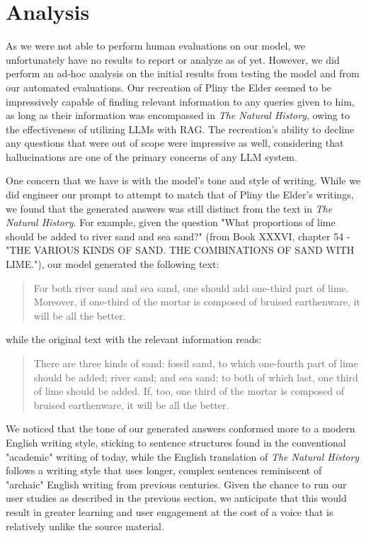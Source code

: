 \documentclass[sigconf]{aamas}
\begin{document}
\section{Analysis}

As we were not able to perform human evaluations on our model, we unfortunately have no results to report or analyze as of yet. However, we did perform an ad-hoc analysis on the initial results from testing the model and from our automated evaluations. Our recreation of Pliny the Elder seemed to be impressively capable of finding relevant information to any queries given to him, as long as their information was encompassed in \textit{The Natural History}, owing to the effectiveness of utilizing LLMs with RAG. The recreation's ability to decline any questions that were out of scope were impressive as well, considering that hallucinations are one of the primary concerns of any LLM system.

One concern that we have is with the model's tone and style of writing. While we did engineer our prompt to attempt to match that of Pliny the Elder's writings, we found that the generated answers was still distinct from the text in \textit{The Natural History}. For example, given the question "What proportions of lime should be added to river sand and sea sand?" (from Book XXXVI, chapter 54 - "THE VARIOUS KINDS OF SAND. THE COMBINATIONS OF SAND WITH LIME."), our model generated the following text:

\begin{quotation}
    For both river sand and sea sand, one should add one-third part of lime. Moreover, if one-third of the mortar is composed of bruised earthenware, it will be all the better.
\end{quotation}
while the original text with the relevant information reads:

\begin{quotation}
    There are three kinds of sand: fossil sand, to which one-fourth part of lime should be added; river sand; and sea sand; to both of which last, one third of lime should be added. If, too, one third of the mortar is composed of bruised earthenware, it will be all the better.
\end{quotation}

We noticed that the tone of our generated answers conformed more to a modern English writing style, sticking to sentence structures found in the conventional "academic" writing of today, while the English translation of \textit{The Natural History} follows a writing style that uses longer, complex sentences reminiscent of "archaic" English writing from previous centuries. Given the chance to run our user studies as described in the previous section, we anticipate that this would result in greater learning and user engagement at the cost of a voice that is relatively unlike the source material.
\end{document}
